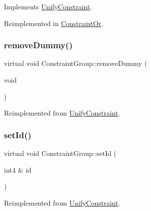 Implements \mbox{\hyperlink{class_unify_constraint_a774f6a611a96384766cb8e8d8f5ff41f}{Unify\+Constraint}}.



Reimplemented in \mbox{\hyperlink{class_constraint_or_a31fc2e3e5eb05b8d279faa97532eb729}{Constraint\+Or}}.

\mbox{\label{class_constraint_group_adf801a2e01c28608fcf7c19305cbb08b}} 
\subsubsection{\texorpdfstring{removeDummy()}{removeDummy()}}
{\footnotesize\ttfamily virtual void Constraint\+Group\+::remove\+Dummy (\begin{DoxyParamCaption}\item[{void}]{ }\end{DoxyParamCaption})\hspace{0.3cm}{\ttfamily [virtual]}}



Reimplemented from \mbox{\hyperlink{class_unify_constraint_ab2ca6cad0ed83f5c765bd0ee8682ca36}{Unify\+Constraint}}.

\mbox{\label{class_constraint_group_a89e8251b6b4ed3c291cf1503531fac20}} 
\subsubsection{\texorpdfstring{setId()}{setId()}}
{\footnotesize\ttfamily virtual void Constraint\+Group\+::set\+Id (\begin{DoxyParamCaption}\item[{int4 \&}]{id }\end{DoxyParamCaption})\hspace{0.3cm}{\ttfamily [virtual]}}



Reimplemented from \mbox{\hyperlink{class_unify_constraint_ae839484226265859ee04807fd7bb7775}{Unify\+Constraint}}.

\mbox{\label{class_constraint_group_aeb75604b690052150d7a94392677dd20}} 
